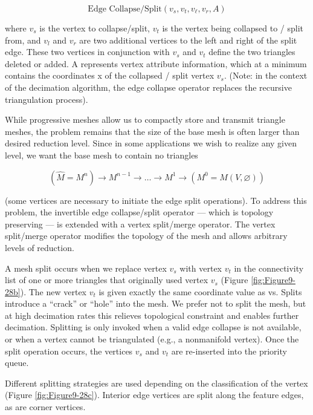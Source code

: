 \begin{description}[leftmargin=0cm,labelindent=0cm]
\begin{equation}\label{eq:9.16}
\text{Edge Collapse/Split}(v_s, v_t, v_\ell, v_r, A)
\end{equation}

where $v_s$ is the vertex to collapse/split, $v_t$ is the vertex being collapsed to / split from, and $v_l$ and $v_r$ are two additional vertices to the left and right of the split edge. These two vertices in conjunction with $v_s$ and $v_t$ define the two triangles deleted or added. A represents vertex attribute information, which at a minimum contains the coordinates x of the collapsed / split vertex $v_s$. (Note: in the context of the decimation algorithm, the edge collapse operator replaces the recursive triangulation process).

While progressive meshes allow us to compactly store and transmit triangle meshes, the problem remains that the size of the base mesh is often larger than desired reduction level. Since in some applications we wish to realize any given level, we want the base mesh to contain no triangles

\begin{equation}\label{eq:9.17}
\left(\hat{M} = M^n \right) \to M^{n - 1} \to \ldots \to M^1 \to \left(M^0 = M(V, \varnothing)\right)
\end{equation}

(some vertices are necessary to initiate the edge split operations). To address this problem, the invertible edge collapse/split operator --- which is topology preserving --- is extended with a vertex split/merge operator. The vertex split/merge operator modifies the topology of the mesh and allows arbitrary levels of reduction.

A mesh split occurs when we replace vertex $v_s$ with vertex $v_t$ in the connectivity list of one or more triangles that originally used vertex $v_s$ (Figure \ref{fig:Figure9-28b}). The new vertex $v_t$ is given exactly the same coordinate value as vs. Splits introduce a ``crack'' or ``hole'' into the mesh. We prefer not to split the mesh, but at high decimation rates this relieves topological constraint and enables further decimation. Splitting is only invoked when a valid edge collapse is not available, or when a vertex cannot be triangulated (e.g., a nonmanifold vertex). Once the split operation occurs, the vertices $v_s$ and $v_t$ are re-inserted into the priority queue.

Different splitting strategies are used depending on the classification of the vertex (Figure \ref{fig:Figure9-28c}). Interior edge vertices are split along the feature edges, as are corner vertices.


\end{description}
